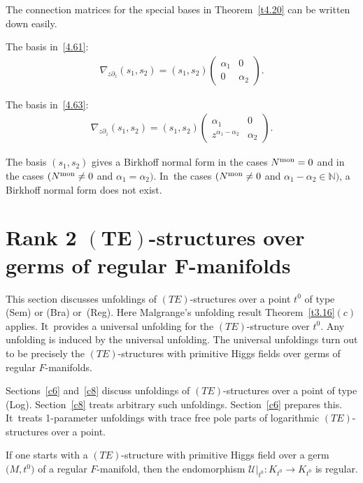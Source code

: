 \documentclass[10pt,a4paper]{amsart}
\numberwithin{equation}{section}
\numberwithin{figure}{section}
\newcommand{\N}{{\mathbb N}}
\newcommand{\UU}{{\mathcal U}}
\newcommand{\paa}{\partial}
\newcommand{\nnn}{\nabla}
\begin{document}
\begin{Remark}\label{t4.22}
The connection matrices for the special bases in
Theorem~\ref{t4.20} can be written down easily.

The basis in~\eqref{4.61}:
\begin{gather*}%
\nnn_{z\paa_z}(s_1,s_2)=(s_1,s_2)
\begin{pmatrix}\alpha_1 & 0 \\ 0 & \alpha_2\end{pmatrix}\!.
\end{gather*}

The basis in~\eqref{4.63}:
\begin{gather*}%
\nnn_{z\paa_z}(s_1,s_2)=(s_1,s_2)
\begin{pmatrix}\alpha_1 & 0 \\ z^{\alpha_1-\alpha_2} & \alpha_2\end{pmatrix}\!.
\end{gather*}

The basis $(s_1,s_2)$ gives a Birkhoff normal form
in the cases $N^{\rm mon}=0$ and in the cases
$(N^{\rm mon}\neq 0$ and $\alpha_1=\alpha_2)$. In~the cases $(N^{\rm mon}\neq 0$ and $\alpha_1-\alpha_2\in\N)$,
a Birkhoff normal form does not exist.
\end{Remark}

\section[Rank 2 $(TE)$-structures over germs of regular $F$-manifolds]{Rank 2 $\boldsymbol{(TE)}$-structures over germs of regular $\boldsymbol{F}$-manifolds}\label{c5}

This section discusses unfoldings of
$(TE)$-structures over a point $t^0$
of type (Sem) or (Bra) or~(Reg).
Here Malgrange's unfolding result
Theorem~\ref{t3.16}$(c)$ applies. It~provides a universal unfolding for the $(TE)$-structure
over $t^0$. Any unfolding is induced by the universal
unfolding.
The universal unfoldings turn out to be precisely
the $(TE)$-structures with primitive Higgs fields
over germs of regular $F$-manifolds.

Sections~\ref{c6} and~\ref{c8} discuss
unfoldings of $(TE)$-structures over a point of type (Log).
Section~\ref{c8} treats arbitrary such unfoldings.
Section~\ref{c6} prepares this. It~treats 1-parameter unfoldings with trace free pole parts
of logarithmic $(TE)$-structures over a point.

If one starts with a $(TE)$-structure with primitive Higgs field
over a germ $\big(M,t^0\big)$ of a regular $F$-manifold, then
the endomorphism $\UU|_{t^0}\colon K_{t^0}\to K_{t^0}$ is regular.
\end{document}
